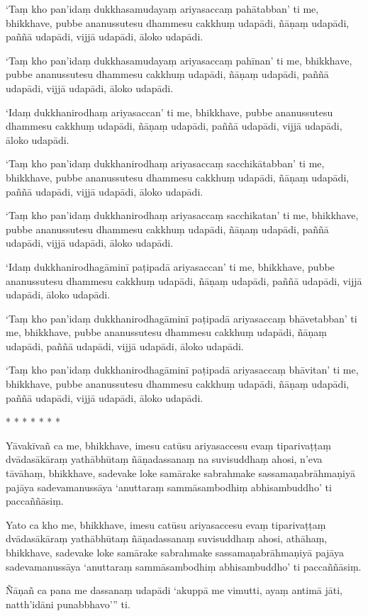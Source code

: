 ‘Taṃ kho pan’idaṃ dukkhasamudayaṃ ariyasaccaṃ pahātabban’ ti me, bhikkhave, pubbe ananussutesu dhammesu cakkhuṃ udapādi, ñāṇaṃ udapādi, paññā udapādi, vijjā udapādi, āloko udapādi.

‘Taṃ kho pan’idaṃ dukkhasamudayaṃ ariyasaccaṃ pahīnan’ ti me, bhikkhave, pubbe ananussutesu dhammesu cakkhuṃ udapādi, ñāṇaṃ udapādi, paññā udapādi, vijjā udapādi, āloko udapādi.

‘Idaṃ dukkhanirodhaṃ ariyasaccan’ ti me, bhikkhave, pubbe ananussutesu dhammesu cakkhuṃ udapādi, ñāṇaṃ udapādi, paññā udapādi, vijjā udapādi, āloko udapādi.

‘Taṃ kho pan’idaṃ dukkhanirodhaṃ ariyasaccaṃ sacchikātabban’ ti me, bhikkhave, pubbe ananussutesu dhammesu cakkhuṃ udapādi, ñāṇaṃ udapādi, paññā udapādi, vijjā udapādi, āloko udapādi.

‘Taṃ kho pan’idaṃ dukkhanirodhaṃ ariyasaccaṃ sacchikatan’ ti me, bhikkhave, pubbe ananussutesu dhammesu cakkhuṃ udapādi, ñāṇaṃ udapādi, paññā udapādi, vijjā udapādi, āloko udapādi.

‘Idaṃ dukkhanirodhagāminī paṭipadā ariyasaccan’ ti me, bhikkhave, pubbe ananussutesu dhammesu cakkhuṃ udapādi, ñāṇaṃ udapādi, paññā udapādi, vijjā udapādi, āloko udapādi.

‘Taṃ kho pan’idaṃ dukkhanirodhagāminī paṭipadā ariyasaccaṃ bhāvetabban’ ti me, bhikkhave, pubbe ananussutesu dhammesu cakkhuṃ udapādi, ñāṇaṃ udapādi, paññā udapādi, vijjā udapādi, āloko udapādi.

‘Taṃ kho pan’idaṃ dukkhanirodhagāminī paṭipadā ariyasaccaṃ bhāvitan’ ti me, bhikkhave, pubbe ananussutesu dhammesu cakkhuṃ udapādi, ñāṇaṃ udapādi, paññā udapādi, vijjā udapādi, āloko udapādi.

\begin{center}
    * * * * * * *
\end{center}

Yāvakīvañ ca me, bhikkhave, imesu catūsu ariyasaccesu evaṃ tiparivaṭṭaṃ dvādasākāraṃ yathābhūtaṃ ñāṇadassanaṃ na suvisuddhaṃ ahosi, n’eva tāvāhaṃ, bhikkhave, sadevake loke samārake sabrahmake sassamaṇabrāhmaṇiyā pajāya sadevamanussāya ‘anuttaraṃ sammāsambodhiṃ abhisambuddho’ ti paccaññāsiṃ.

Yato ca kho me, bhikkhave, imesu catūsu ariyasaccesu evaṃ tiparivaṭṭaṃ dvādasākāraṃ yathābhūtaṃ ñāṇadassanaṃ suvisuddhaṃ ahosi, athāhaṃ, bhikkhave, sadevake loke samārake sabrahmake sassamaṇabrāhmaṇiyā pajāya sadevamanussāya ‘anuttaraṃ sammāsambodhiṃ abhisambuddho’ ti paccaññāsiṃ.

Ñāṇañ ca pana me dassanaṃ udapādi ‘akuppā me vimutti‚ ayaṃ antimā jāti, natth’idāni punabbhavo’” ti.

